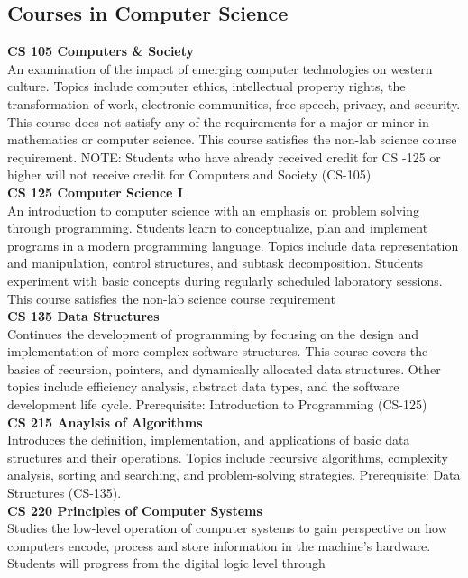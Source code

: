 \documentclass[
  letterpaper,
]{scrbook}
\begin{document}
\subsection{Courses in Computer
Science}\label{courses-in-computer-science}

\textbf{CS 105 Computers \& Society}\\
An examination of the impact of emerging computer technologies on
western culture. Topics include computer ethics, intellectual property
rights, the transformation of work, electronic communities, free speech,
privacy, and security. This course does not satisfy any of the
requirements for a major or minor in mathematics or computer science.
This course satisfies the non-lab science course requirement. NOTE:
Students who have already received credit for CS -125 or higher will not
receive credit for Computers and Society (CS-105)\\
\textbf{CS 125 Computer Science I}\\
An introduction to computer science with an emphasis on problem solving
through programming. Students learn to conceptualize, plan and implement
programs in a modern programming language. Topics include data
representation and manipulation, control structures, and subtask
decomposition. Students experiment with basic concepts during regularly
scheduled laboratory sessions. This course satisfies the non-lab science
course requirement\\
\textbf{CS 135 Data Structures}\\
Continues the development of programming by focusing on the design and
implementation of more complex software structures. This course covers
the basics of recursion, pointers, and dynamically allocated data
structures. Other topics include efficiency analysis, abstract data
types, and the software development life cycle. Prerequisite:
Introduction to Programming (CS-125)\\
\textbf{CS 215 Anaylsis of Algorithms}\\
Introduces the definition, implementation, and applications of basic
data structures and their operations. Topics include recursive
algorithms, complexity analysis, sorting and searching, and
problem-solving strategies. Prerequisite: Data Structures (CS-135).\\
\textbf{CS 220 Principles of Computer Systems}\\
Studies the low-level operation of computer systems to gain perspective
on how computers encode, process and store information in the machine's
hardware. Students will progress from the digital logic level through
\end{document}
